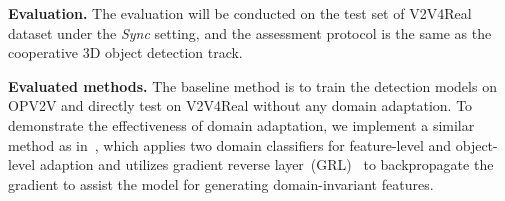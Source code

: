 \documentclass[10pt,twocolumn,letterpaper]{article}
\begin{document}
 \noindent\textbf{Evaluation.} The evaluation will be conducted on the test set of V2V4Real dataset under the \textit{Sync} setting, and the assessment protocol is the same as the cooperative 3D object detection track.

 \noindent\textbf{Evaluated methods.} The baseline method is to train the detection models on OPV2V  and directly test on V2V4Real  without any domain adaptation. To demonstrate the effectiveness of domain adaptation, we implement a similar method as in~\cite{chen2018domain}, which applies two domain classifiers for feature-level and object-level adaption and utilizes gradient reverse layer~(GRL)~\cite{ganin2015unsupervised} to backpropagate the gradient to assist the model for generating domain-invariant features.



\end{document}

